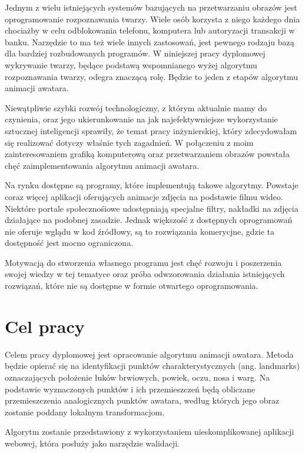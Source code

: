 Jednym z wielu istniejących systemów bazujących na przetwarzaniu obrazów jest oprogramowanie rozpoznawania twarzy. Wiele osób korzysta z niego każdego dnia chociażby w celu odblokowania telefonu, komputera lub autoryzacji transakcji w banku. Narzędzie to ma też wiele innych zastosowań, jest pewnego rodzaju bazą dla bardziej rozbudowanych programów. W niniejszej pracy dyplomowej wykrywanie twarzy, będące podstawą wspomnianego wyżej algorytmu rozpoznawania twarzy, odegra znaczącą rolę. Będzie to jeden z etapów algorytmu animacji awatara.

Niewątpliwie szybki rozwój technologiczny, z którym aktualnie mamy do czynienia, oraz jego ukierunkowanie na jak najefektywniejsze wykorzystanie sztucznej inteligencji sprawiły, że temat pracy inżynierskiej, który zdecydowałam się realizować dotyczy właśnie tych zagadnień. W połączeniu z moim zainteresowaniem grafiką komputerową oraz przetwarzaniem obrazów powstała chęć zaimplementowania algorytmu animacji awatara.

Na rynku dostępne są programy, które implementują takowe algorytmy. Powstaje coraz więcej aplikacji oferujących animacje zdjęcia na podstawie filmu wideo. Niektóre portale społecznośiowe udostępniają specjalne filtry, nakładki na zdjęcia działające na podobnej zasadzie. Jednak większość z dostępnych oprogramowań nie oferuje wglądu w kod źródłowy, są to rozwiązania komerycjne, gdzie ta dostępność jest mocno ograniczona.

Motywacją do stworzenia własnego programu jest chęć rozwoju i poszerzenia swojej wiedzy w tej tematyce oraz próba odwzorowania działania istniejących rozwiązań, które nie są dostępne w formie otwartego oprogramowania. 



\section{Cel pracy}

Celem pracy dyplomowej jest opracowanie algorytmu animacji awatara. Metoda będzie opierać się na identyfikacji punktów charakterystycznych (ang. landmarks) oznaczających położenie łuków brwiowych, powiek, oczu, nosa i warg. Na podstawie wyznaczonych punktów i ich przemieszczeń będą obliczane przemieszczenia analogicznych punktów awatara, według których jego obraz zostanie poddany lokalnym transformacjom.

Algorytm zostanie przedstawiony z wykorzystaniem nieskomplikowanej aplikacji webowej, która posłuży jako narzędzie walidacji.

